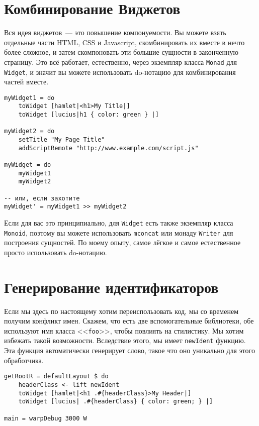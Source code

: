 \section{Комбинирование Виджетов}
Вся идея виджетов~--- это повышение компонуемости. Вы можете взять отдельные части HTML, CSS и Javascript, скомбинировать их вместе в нечто более сложное, и затем скомпоновать эти большие сущности в законченную страницу. Это всё работает, естественно, через экземпляр класса \lstinline'Monad' для \lstinline'Widget', и значит вы можете использовать do-нотацию для комбинирования частей вместе.
\begin{lstlisting}[caption={Комбинирование Виджетов}]
myWidget1 = do
    toWidget [hamlet|<h1>My Title|]
    toWidget [lucius|h1 { color: green } |]

myWidget2 = do
    setTitle "My Page Title"
    addScriptRemote "http://www.example.com/script.js"

myWidget = do
    myWidget1
    myWidget2

-- или, если захотите
myWidget' = myWidget1 >> myWidget2
\end{lstlisting}
\begin{remark}
Если для вас это принципиально, для \lstinline'Widget' есть также экземпляр класса \lstinline'Monoid', поэтому вы можете использовать \lstinline'mconcat' или монаду \lstinline'Writer' для построения сущностей. По моему опыту, самое лёгкое и самое естественное просто использовать do-нотацию.
\end{remark}

\section{Генерирование идентификаторов}
Если мы здесь по настоящему хотим переиспользовать код, мы со временем получим конфликт имен. Скажем, что есть две вспомогательные библиотеки, обе используют имя класса <<\lstinline'foo'>>, чтобы повлиять на стилистику. Мы хотим избежать такой возможности. Вследствие этого, мы имеет \lstinline'newIdent' функцию.  Эта функция автоматически генерирует слово, такое что оно уникально для этого обработчика.


\begin{lstlisting}[caption={Использование \lstinline'newIdent'}]
getRootR = defaultLayout $ do
    headerClass <- lift newIdent
    toWidget [hamlet|<h1 .#{headerClass}>My Header|]
    toWidget [lucius| .#{headerClass} { color: green; } |]

main = warpDebug 3000 W
\end{lstlisting}

